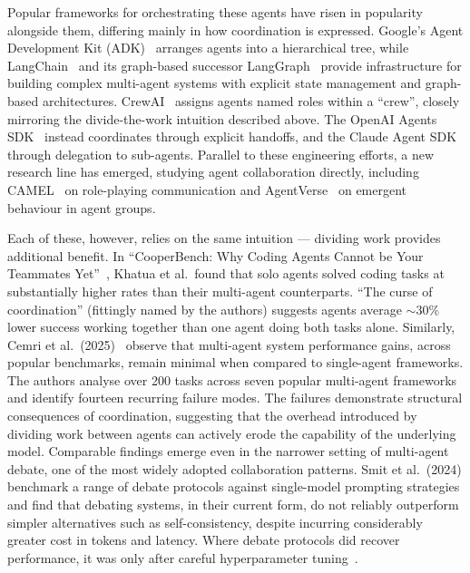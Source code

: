 \documentclass[11pt,a4paper]{article}
\begin{document}
Popular frameworks for orchestrating these agents have risen in popularity alongside them, differing mainly in how coordination is expressed. Google's Agent Development Kit (ADK)~\cite{google2025adk} arranges agents into a hierarchical tree, while LangChain~\cite{chase2022langchain} and its graph-based successor LangGraph~\cite{langchain2024langgraph} provide infrastructure for building complex multi-agent systems with explicit state management and graph-based architectures. CrewAI~\cite{crewai} assigns agents named roles within a ``crew'', closely mirroring the divide-the-work intuition described above. The OpenAI Agents SDK~\cite{openai2025agents} instead coordinates through explicit handoffs, and the Claude Agent SDK~\cite{anthropic2025claudesdk} through delegation to sub-agents. Parallel to these engineering efforts, a new research line has emerged, studying agent collaboration directly, including CAMEL~\cite{li2023camel} on role-playing communication and AgentVerse~\cite{chen2023agentverse} on emergent behaviour in agent groups.

Each of these, however, relies on the same intuition --- dividing work provides additional benefit. In ``CooperBench: Why Coding Agents Cannot be Your Teammates Yet''~\cite{khatua2026cooperbench}, Khatua et al.\ found that solo agents solved coding tasks at substantially higher rates than their multi-agent counterparts. ``The curse of coordination'' (fittingly named by the authors) suggests agents average ${\sim}30\%$ lower success working together than one agent doing both tasks alone. Similarly, Cemri et al.\ (2025)~\cite{cemri2025why} observe that multi-agent system performance gains, across popular benchmarks, remain minimal when compared to single-agent frameworks. The authors analyse over 200 tasks across seven popular multi-agent frameworks and identify fourteen recurring failure modes. The failures demonstrate structural consequences of coordination, suggesting that the overhead introduced by dividing work between agents can actively erode the capability of the underlying model. Comparable findings emerge even in the narrower setting of multi-agent debate, one of the most widely adopted collaboration patterns. Smit et al.\ (2024) benchmark a range of debate protocols against single-model prompting strategies and find that debating systems, in their current form, do not reliably outperform simpler alternatives such as self-consistency, despite incurring considerably greater cost in tokens and latency. Where debate protocols did recover performance, it was only after careful hyperparameter tuning~\cite{smit2024mad}.
\end{document}
